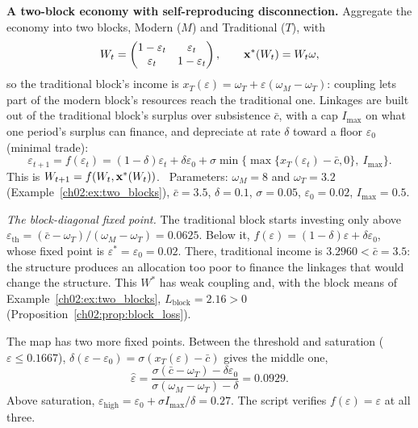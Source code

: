 \documentclass[../solutions_manual.tex]{subfiles}
\begin{document}

 \textbf{A two-block economy with self-reproducing disconnection.} Aggregate the economy into two blocks, Modern ($M$) and Traditional ($T$), with
\[
W_t = \begin{pmatrix} 1 - \varepsilon_t & \varepsilon_t \\ \varepsilon_t & 1 - \varepsilon_t\end{pmatrix}, \qquad \mathbf{x}^*(W_t) = W_t\omega ,
\]
so the traditional block's income is $x_T(\varepsilon) = \omega_T + \varepsilon(\omega_M - \omega_T)$: coupling lets part of the modern block's resources reach the traditional one. Linkages are built out of the traditional block's surplus over subsistence $\bar c$, with a cap $I_{\max}$ on what one period's surplus can finance, and depreciate at rate $\delta$ toward a floor $\varepsilon_0$ (minimal trade):
\[
\varepsilon_{t+1} = f(\varepsilon_t) = (1-\delta)\varepsilon_t + \delta\varepsilon_0 + \sigma\min\{\max\{x_T(\varepsilon_t) - \bar c, 0\},\ I_{\max}\}.
\]
This is $W_{t+1} = f(W_t, \mathbf{x}^*(W_t))$. \illustrative\ Parameters: $\omega_M = 8$ and $\omega_T = 3.2$ (Example~\ref{ch02:ex:two_blocks}), $\bar c = 3.5$, $\delta = 0.1$, $\sigma = 0.05$, $\varepsilon_0 = 0.02$, $I_{\max} = 0.5$.

\emph{The block-diagonal fixed point.} The traditional block starts investing only above $\varepsilon_{\text{th}} = (\bar c - \omega_T)/(\omega_M - \omega_T) = 0.0625$. Below it, $f(\varepsilon) = (1 - \delta)\varepsilon + \delta\varepsilon_0$, whose fixed point is $\varepsilon^* = \varepsilon_0 = 0.02$. There, traditional income is $3.2960 < \bar c = 3.5$: the structure produces an allocation too poor to finance the linkages that would change the structure. This $W^*$ has weak coupling and, with the block means of Example~\ref{ch02:ex:two_blocks}, $L_{\text{block}} = 2.16 > 0$ (Proposition~\ref{ch02:prop:block_loss}).

The map has two more fixed points. Between the threshold and saturation ($\varepsilon \le 0.1667$), $\delta(\varepsilon - \varepsilon_0) = \sigma(x_T(\varepsilon) - \bar c)$ gives the middle one,
\[
\hat\varepsilon = \frac{\sigma(\bar c - \omega_T) - \delta\varepsilon_0}{\sigma(\omega_M - \omega_T) - \delta} = 0.0929 .
\]
Above saturation, $\varepsilon_{\text{high}} = \varepsilon_0 + \sigma I_{\max}/\delta = 0.27$. The script verifies $f(\varepsilon) = \varepsilon$ at all three.
\end{document}

